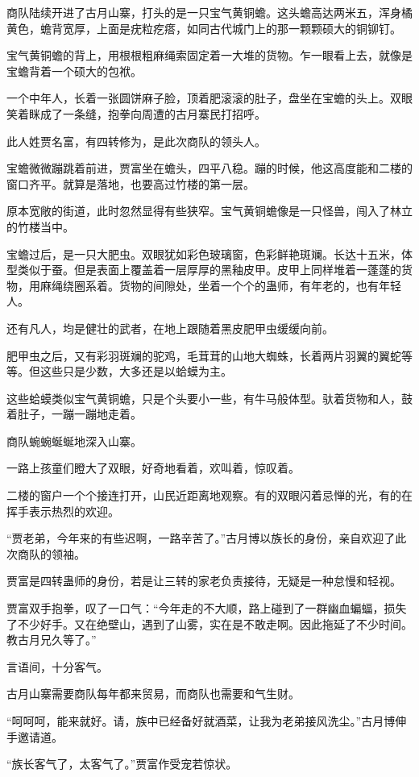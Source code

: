 \begin{this_body}
商队陆续开进了古月山寨，打头的是一只宝气黄铜蟾。这头蟾高达两米五，浑身橘黄色，蟾背宽厚，上面是疣粒疙瘩，如同古代城门上的那一颗颗硕大的铜铆钉。

宝气黄铜蟾的背上，用根根粗麻绳索固定着一大堆的货物。乍一眼看上去，就像是宝蟾背着一个硕大的包袱。

一个中年人，长着一张圆饼麻子脸，顶着肥滚滚的肚子，盘坐在宝蟾的头上。双眼笑着眯成了一条缝，抱拳向周遭的古月寨民打招呼。

此人姓贾名富，有四转修为，是此次商队的领头人。

宝蟾微微蹦跳着前进，贾富坐在蟾头，四平八稳。蹦的时候，他这高度能和二楼的窗口齐平。就算是落地，也要高过竹楼的第一层。

原本宽敞的街道，此时忽然显得有些狭窄。宝气黄铜蟾像是一只怪兽，闯入了林立的竹楼当中。

宝蟾过后，是一只大肥虫。双眼犹如彩色玻璃窗，色彩鲜艳斑斓。长达十五米，体型类似于蚕。但是表面上覆盖着一层厚厚的黑釉皮甲。皮甲上同样堆着一蓬蓬的货物，用麻绳绕圈系着。货物的间隙处，坐着一个个的蛊师，有年老的，也有年轻人。

还有凡人，均是健壮的武者，在地上跟随着黑皮肥甲虫缓缓向前。

肥甲虫之后，又有彩羽斑斓的驼鸡，毛茸茸的山地大蜘蛛，长着两片羽翼的翼蛇等等。但这些只是少数，大多还是以蛤蟆为主。

这些蛤蟆类似宝气黄铜蟾，只是个头要小一些，有牛马般体型。驮着货物和人，鼓着肚子，一蹦一蹦地走着。

商队蜿蜿蜒蜒地深入山寨。

一路上孩童们瞪大了双眼，好奇地看着，欢叫着，惊叹着。

二楼的窗户一个个接连打开，山民近距离地观察。有的双眼闪着忌惮的光，有的在挥手表示热烈的欢迎。

“贾老弟，今年来的有些迟啊，一路辛苦了。”古月博以族长的身份，亲自欢迎了此次商队的领袖。

贾富是四转蛊师的身份，若是让三转的家老负责接待，无疑是一种怠慢和轻视。

贾富双手抱拳，叹了一口气：“今年走的不大顺，路上碰到了一群幽血蝙蝠，损失了不少好手。又在绝壁山，遇到了山雾，实在是不敢走啊。因此拖延了不少时间。教古月兄久等了。”

言语间，十分客气。

古月山寨需要商队每年都来贸易，而商队也需要和气生财。

“呵呵呵，能来就好。请，族中已经备好就酒菜，让我为老弟接风洗尘。”古月博伸手邀请道。

“族长客气了，太客气了。”贾富作受宠若惊状。


\end{this_body}
